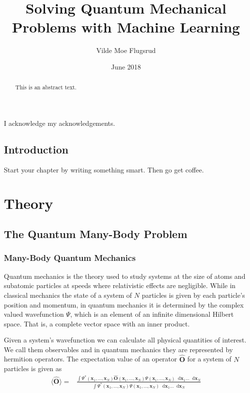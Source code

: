\documentclass[twoside,english]{uiofysmaster}
\author{Vilde Moe Flugsrud}
\title{Solving Quantum Mechanical Problems with Machine Learning}
\date{June 2018}
\newcommand*\dif{\mathop{}\!\mathrm{d}}
\begin{document}
\maketitle

\begin{abstract}
This is an abstract text.
\end{abstract}

\begin{acknowledgements}
  I acknowledge my acknowledgements.
\end{acknowledgements}

\tableofcontents

\chapter{Introduction}

Start your chapter by writing something smart. Then go get coffee.

\part{Theory}
\chapter{The Quantum Many-Body Problem}

\section{Many-Body Quantum Mechanics}
Quantum mechanics is the theory used to study systems at the size of atoms and subatomic particles at speeds where relativistic effects are negligible. While in classical mechanics the state of a system of $N$ particles is given by each particle's position and momentum, in quantum mechanics it is determined by the complex valued wavefunction $\Psi$, which is an element of an infinite dimensional Hilbert space. That is, a complete vector space with an inner product.\cite{Kvaal2017}

Given a system's wavefunction we can calculate all physical quantities of interest\cite{Kvaal2017}. We call them observables and in quantum mechanics they are represented by hermition operators.
The expectation value of an operator $\hat{\bm{O}}$ for a system of $N$ particles is given as \cite{HjortJensen2015}
\begin{align}
	\langle \hat{\bm{O}} \rangle =& \frac{\int \Psi^{\ast}(\bm{x}_1,...,\bm{x}_N) \hat{\bm{O}}(\bm{x}_1,...,\bm{x}_N)
	\Psi (\bm{x}_1,...,\bm{x}_N)
	\dif \bm{x}_1 ... \dif \bm{x}_N  }
	{\int \Psi^{\ast}(\bm{x}_1,...,\bm{x}_N)
	\Psi (\bm{x}_1,...,\bm{x}_N)
	\dif \bm{x}_1 ... \dif \bm{x}_N}
\end{align}
\end{document}
